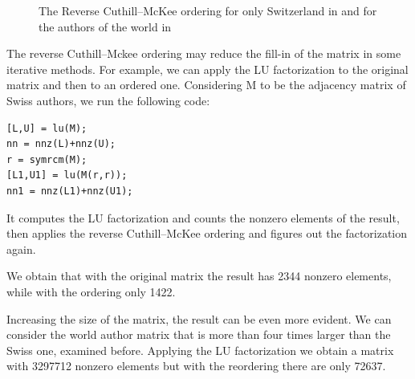 \documentclass[]{usiinfbachelorproject}
\begin{document}
\begin{figure}[tb]
	\centering
	\caption{ The Reverse Cuthill--McKee ordering for only Switzerland in  and for the authors of the world in }
	\label{fig:CuthillMcKee}
\end{figure}

The reverse Cuthill--Mckee ordering may reduce the fill-in of the matrix in some iterative methods. For example, we can apply the LU factorization to the original matrix and then to an ordered one. Considering M to be the  adjacency matrix of Swiss authors, we run the following code:

\lstset{language=Matlab}
\begin{lstlisting}
[L,U] = lu(M); 	  
nn = nnz(L)+nnz(U);
r = symrcm(M);
[L1,U1] = lu(M(r,r));
nn1 = nnz(L1)+nnz(U1);
\end{lstlisting}

It computes the LU factorization and counts the nonzero elements of the result, then applies the reverse Cuthill--McKee ordering and figures out the factorization again.

We obtain that with the original matrix the result has 2344 nonzero elements, while with the ordering only 1422. 

Increasing the size of the matrix, the result can be even more evident. We can consider the world author matrix that is more than four times larger than the Swiss one, examined before. Applying the LU factorization we obtain a matrix with 3297712 nonzero elements but with the reordering there are only 72637.
\end{document}
